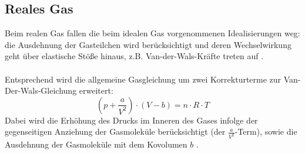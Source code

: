 \documentclass[a4paper,titlepage]{scrartcl}
\numberwithin{equation}{section}
\begin{document}
\subsection{Reales Gas}
Beim realen Gas fallen die beim idealen Gas vorgenommenen Idealisierungen weg: die Ausdehnung der Gasteilchen wird berücksichtigt und deren Wechselwirkung geht über elastische Stöße hinaus, z.B. Van-der-Wals-Kräfte treten auf \cite{wiki:realesGas}.\\ \\
Entsprechend wird die allgemeine Gasgleichung um zwei Korrekturterme zur Van-Der-Wals-Gleichung erweitert:
\begin{equation*}
\left(p + \frac{a}{V^2}\right) \cdot \left(V - b \right)=n \cdot R \cdot T
\end{equation*}
Dabei wird die Erhöhung des Drucks im Inneren des Gases infolge der gegenseitigen Anziehung der Gasmoleküle berücksichtigt (der $\frac{a}{V^2}$-Term), sowie die Ausdehnung der Gasmoleküle mit dem Kovolumen $b$ \cite{wiki:vanDerValsGleichung}.
\end{document}
